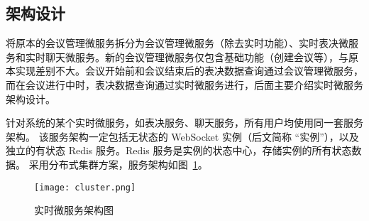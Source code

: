 \subsection{架构设计}
将原本的会议管理微服务拆分为会议管理微服务（除去实时功能）、实时表决微服务和实时聊天微服务。新的会议管理微服务仅包含基础功能（创建会议等），与原本实现差别不大。会议开始前和会议结束后的表决数据查询通过会议管理微服务，而在会议进行中时，表决数据查询通过实时微服务进行，后面主要介绍实时微服务架构设计。

针对系统的某个实时微服务，如表决服务、聊天服务，所有用户均使用同一套服务架构。
该服务架构一定包括无状态的 WebSocket 实例（后文简称 “实例”），以及独立的有状态 Redis 服务。Redis 服务是实例的状态中心，存储实例的所有状态数据。
采用分布式集群方案，服务架构如图~\ref{fig:cluster}。

\begin{figure}[!htp]
  \centering
  \texttt{[image: cluster.png]}
  \caption[实时微服务架构]
    {实时微服务架构图}
 \label{fig:cluster}
\end{figure}

